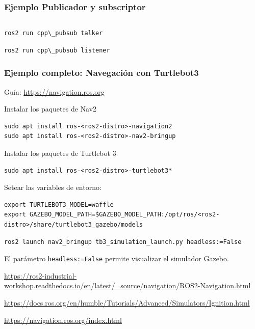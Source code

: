 \begin{frame}[fragile]
    \frametitle{Ejemplo Publicador y subscriptor}
    
    \begin{columns}
        \begin{column}{0.5\textwidth}
            
        \end{column}
        \begin{column}{0.5\textwidth}
            
        \end{column}
    \end{columns}
    
\begin{lstlisting}[style=bash] 
ros2 run cpp\_pubsub talker
\end{lstlisting}

\begin{lstlisting}[style=bash] 
ros2 run cpp\_pubsub listener
\end{lstlisting}
\end{frame}


\begin{frame}[fragile]
	\frametitle{Ejemplo completo: Navegación con Turtlebot3}

\footnotesize
    
Guía: \url{https://navigation.ros.org}
    
Instalar los paquetes de Nav2 
\begin{lstlisting}[style=bash] 
sudo apt install ros-<ros2-distro>-navigation2
sudo apt install ros-<ros2-distro>-nav2-bringup
\end{lstlisting}
    
Instalar los paquetes de Turtlebot 3
\begin{lstlisting}[style=bash] 
sudo apt install ros-<ros2-distro>-turtlebot3*
\end{lstlisting}
    
Setear las variables de entorno:
\begin{lstlisting}[style=bash] 
export TURTLEBOT3_MODEL=waffle
export GAZEBO_MODEL_PATH=$GAZEBO_MODEL_PATH:/opt/ros/<ros2-distro>/share/turtlebot3_gazebo/models
\end{lstlisting}

\begin{lstlisting}[style=bash] 
ros2 launch nav2_bringup tb3_simulation_launch.py headless:=False
\end{lstlisting}

    El parámetro \lstinline{headless:=False} permite visualizar el simulador Gazebo.
     
    \url{https://ros2-industrial-workshop.readthedocs.io/en/latest/\_source/navigation/ROS2-Navigation.html}
        
    \url{https://docs.ros.org/en/humble/Tutorials/Advanced/Simulators/Ignition.html}
        
    \url{https://navigation.ros.org/index.html} 

\end{frame}


